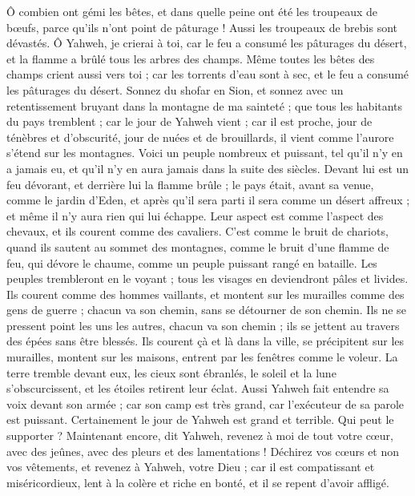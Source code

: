\begin{multicols}{2}
Ô combien ont gémi les bêtes, et dans quelle peine ont été les troupeaux de bœufs, parce qu’ils n’ont point de pâturage ! Aussi les troupeaux de brebis sont dévastés.
Ô Yahweh, je crierai à toi, car le feu a consumé les pâturages du désert, et la flamme a brûlé tous les arbres des champs.
Même toutes les bêtes des champs crient aussi vers toi ; car les torrents d’eau sont à sec, et le feu a consumé les pâturages du désert.
\VerseOne{}Sonnez du shofar en Sion, et sonnez avec un retentissement bruyant dans la montagne de ma sainteté ; que tous les habitants du pays tremblent ; car le jour de Yahweh vient ; car il est proche,
jour de ténèbres et d'obscurité, jour de nuées et de brouillards, il vient comme l'aurore s'étend sur les montagnes. Voici un peuple nombreux et puissant, tel qu’il n’y en a jamais eu, et qu’il n’y en aura jamais dans la suite des siècles.
Devant lui est un feu dévorant, et derrière lui la flamme brûle ; le pays était, avant sa venue, comme le jardin d’Eden, et après qu’il sera parti il sera comme un désert affreux ; et même il n’y aura rien qui lui échappe.
Leur aspect est comme l’aspect des chevaux, et ils courent comme des cavaliers.
C’est comme le bruit de chariots, quand ils sautent au sommet des montagnes, comme le bruit d’une flamme de feu, qui dévore le chaume, comme un peuple puissant rangé en bataille.
Les peuples trembleront en le voyant ; tous les visages en deviendront pâles et livides.
Ils courent comme des hommes vaillants, et montent sur les murailles comme des gens de guerre ; chacun va son chemin, sans se détourner de son chemin.
Ils ne se pressent point les uns les autres, chacun va son chemin ; ils se jettent au travers des épées sans être blessés.
Ils courent çà et là dans la ville, se précipitent sur les murailles, montent sur les maisons, entrent par les fenêtres comme le voleur.
La terre tremble devant eux, les cieux sont ébranlés, le soleil et la lune s’obscurcissent, et les étoiles retirent leur éclat.
Aussi Yahweh fait entendre sa voix devant son armée ; car son camp est très grand, car l'exécuteur de sa parole est puissant. Certainement le jour de Yahweh est grand et terrible. Qui peut le supporter ?
Maintenant encore, dit Yahweh, revenez à moi de tout votre cœur, avec des jeûnes, avec des pleurs et des lamentations !
Déchirez vos cœurs et non vos vêtements, et revenez à Yahweh, votre Dieu ; car il est compatissant et miséricordieux, lent à la colère et riche en bonté, et il se repent d’avoir affligé.

\end{multicols}
